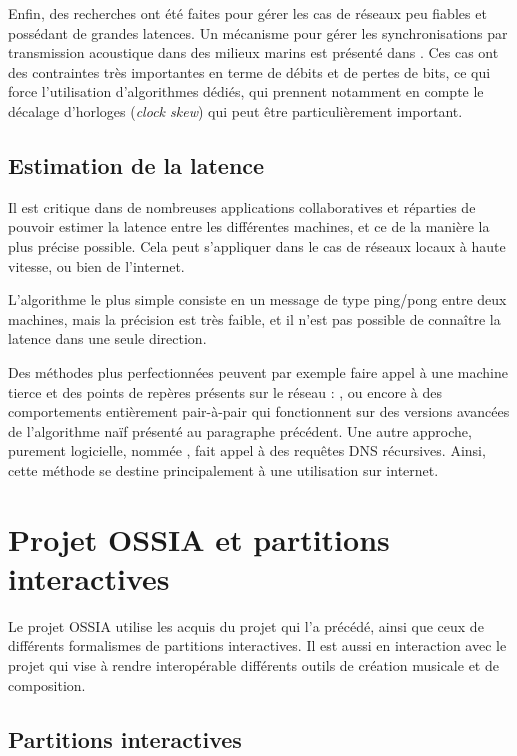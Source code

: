 Enfin, des recherches ont été faites pour gérer les cas de réseaux peu fiables et possédant de grandes latences. Un mécanisme pour gérer les synchronisations par transmission acoustique dans des milieux marins est présenté dans \cite{syed2006time}. Ces cas ont des contraintes très importantes en terme de débits et de pertes de bits, ce qui force l'utilisation d'algorithmes dédiés, qui prennent notamment en compte le décalage d'horloges (\textit{clock skew}) qui peut être particulièrement important.
\subsection{Estimation de la latence}
\label{section:latence}
Il est critique dans de nombreuses applications collaboratives et réparties de pouvoir estimer la latence entre les différentes machines, et ce de la manière la plus précise possible. Cela peut s'appliquer dans le cas de réseaux locaux à haute vitesse, ou bien de l'internet.

L'algorithme le plus simple consiste en un message de type ping/pong entre deux machines, mais la précision est très faible, et il n'est pas possible de connaître la latence dans une seule direction.

Des méthodes plus perfectionnées peuvent par exemple faire appel à une machine tierce et des points de repères présents sur le réseau : \cite{banerjee2012network}, ou encore à des comportements entièrement pair-à-pair \cite{im2000method} qui fonctionnent sur des versions avancées de l'algorithme naïf présenté au paragraphe précédent. 
Une autre approche, purement logicielle, nommée  \cite{gummadi2002king}, fait appel à des requêtes \ac{DNS} récursives. Ainsi, cette méthode se destine principalement à une utilisation sur internet.

\section{Projet OSSIA et partitions interactives}
Le projet \ac{OSSIA} utilise les acquis du projet  \cite{baltazar2009virage} qui l'a précédé, ainsi que ceux de différents formalismes de partitions interactives. Il est aussi en interaction avec le projet  \cite{fober2013caracterisation} qui vise à rendre interopérable différents outils de création musicale et de composition.

\subsection{Partitions interactives}

